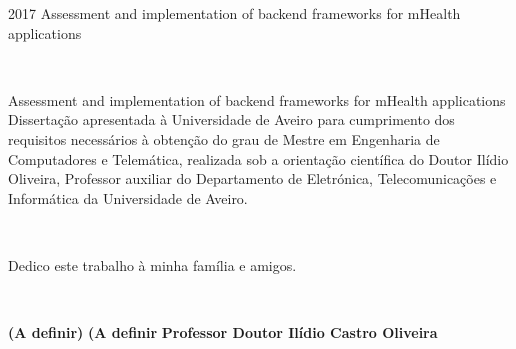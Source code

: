 \documentclass[11pt,twoside,a4paper]{report}
\def\ThesisYear{2017}
\begin{document}
%
%

\TitlePage
  \HEADER{\BAR\FIG{}}
         {\ThesisYear}
      \TITLE{}{}
      \TITLE{}{}
  \TITLE{}
        {Assessment and implementation of backend frameworks for mHealth applications}

\EndTitlePage
\titlepage\ \endtitlepage %


%
%

\TitlePage
  \HEADER{}{\ThesisYear}
      \TITLE{}{}
      \TITLE{}{}
  \TITLE{}
        {Assessment and implementation of backend frameworks for mHealth applications}
  \vspace*{15mm}
  \TEXT{}
       {Disserta\c c\~ao apresentada \`a Universidade de Aveiro para cumprimento dos requisitos necess\'arios \`a obten\c c\~ao do
        grau de Mestre em Engenharia de Computadores e Telem\'atica, realizada sob a orienta\c c\~ao cient\'ifica do Doutor Il\'idio Oliveira, Professor auxiliar do Departamento de Eletr\'onica, Telecomunica\c c\~oes e Inform\'atica da Universidade de Aveiro.}
\EndTitlePage
\titlepage\ \endtitlepage %


\titlepage\ 

\vspace*{30mm}\begin{flushright}
Dedico este trabalho à minha família e amigos.
\end{flushright}
\endtitlepage

\titlepage\ \endtitlepage %

\TitlePage
  \vspace*{55mm}
       {}
       {\textbf{(A definir)}}
  \vspace*{5mm}
       {\textbf{(A definir}}
  \vspace*{5mm}
  \TEXT{}
       {\textbf{Professor Doutor Ilídio Castro Oliveira}}
\EndTitlePage
\titlepage\ \endtitlepage %
\end{document}
